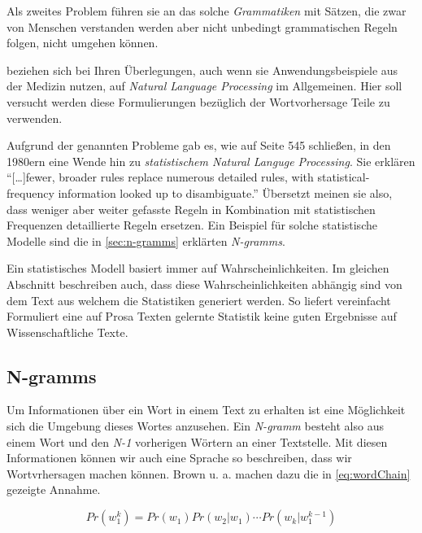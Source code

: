         Als zweites Problem führen sie an das solche \emph{Grammatiken} mit Sätzen, die zwar von Menschen verstanden werden aber nicht unbedingt grammatischen Regeln folgen, nicht umgehen können.
        
        \cite{jamia:introduction} beziehen sich bei Ihren Überlegungen, auch wenn sie Anwendungsbeispiele aus der Medizin nutzen, auf \emph{Natural Language Processing} im Allgemeinen. Hier soll versucht werden diese Formulierungen bezüglich der Wortvorhersage Teile zu verwenden.
        
        Aufgrund der genannten Probleme gab es, wie \cite{jamia:introduction} auf Seite 545 schließen, in den 1980ern eine Wende hin zu \emph{statistischem Natural Languge Processing}. Sie erklären \enquote{[\dots]fewer, broader rules replace numerous detailed rules, with statistical-frequency information looked up to disambiguate.} Übersetzt meinen sie also, dass weniger aber weiter gefasste Regeln in Kombination mit statistischen Frequenzen detaillierte Regeln ersetzen. Ein Beispiel für solche statistische Modelle sind die in \autoref{sec:n-gramms} erklärten \emph{N-gramms}.
        
        Ein statistisches Modell basiert immer auf Wahrscheinlichkeiten. Im gleichen Abschnitt beschreiben \cite{jamia:introduction} auch, dass diese Wahrscheinlichkeiten abhängig sind von dem Text aus welchem die Statistiken generiert werden. So liefert vereinfacht Formuliert eine auf Prosa Texten gelernte Statistik keine guten Ergebnisse auf Wissenschaftliche Texte.  
        
    \newpage
    \subsection{N-gramms}
    \label{sec:n-gramms}
    
    	Um Informationen über ein Wort in einem Text zu erhalten ist eine Möglichkeit sich die Umgebung dieses Wortes anzusehen. Ein \emph{N-gramm} besteht also aus einem Wort und den \emph{N-1} vorherigen Wörtern an einer Textstelle. Mit diesen Informationen können wir auch eine Sprache so beschreiben, dass wir Wortvrhersagen machen können. Brown u. a. machen dazu die in \autoref{eq:wordChain} \parencite[S. 468, Gleichung 1]{cumpatationalLinguistics:classBasedNGramms} gezeigte Annahme.
        
        \begin{equation}
        	Pr(w_1^k) = Pr(w_1) Pr(w_2|w_1) \cdots Pr(w_k|w_1^{k-1})
        	\label{eq:wordChain}
        \end{equation}
        
